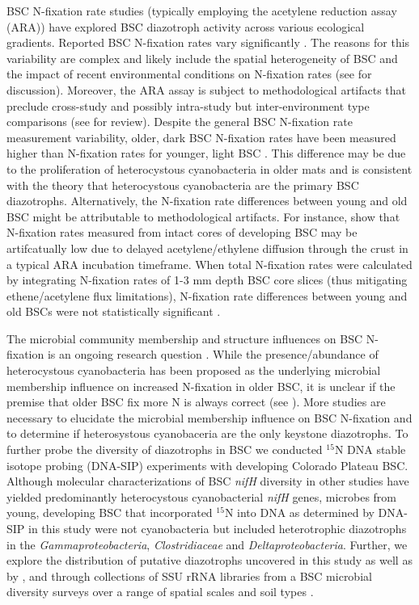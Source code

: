 BSC N-fixation rate studies (typically employing the acetylene reduction assay (ARA)) have explored BSC diazotroph activity across various ecological gradients. Reported BSC N-fixation rates vary significantly \cite{Evans_2001}. The reasons for this variability are complex and likely include the spatial heterogeneity of BSC \cite{Evans_2001} and the impact of recent environmental conditions on N-fixation rates (see \citet{Belnap_2001} for discussion). Moreover, the ARA assay is subject to methodological artifacts that preclude cross-study and possibly intra-study but inter-environment type comparisons (see \citet{Belnap_2001} for review). Despite the general BSC N-fixation rate measurement variability, older, dark BSC N-fixation rates have been measured higher than N-fixation rates for younger, light BSC \cite{Belnap_2002}. This difference may be due to the proliferation of heterocystous cyanobacteria in older mats and is consistent with the theory that heterocystous cyanobacteria are the primary BSC diazotrophs. Alternatively, the N-fixation rate differences between young and old BSC might be attributable to methodological artifacts. For instance, \citet{15643930} show that N-fixation rates measured from intact cores of developing BSC may be artifcatually low due to delayed acetylene/ethylene diffusion through the crust in a typical ARA incubation timeframe. When total N-fixation rates were calculated by integrating N-fixation rates of 1-3 mm depth BSC core slices (thus mitigating ethene/acetylene flux limitations), N-fixation rate differences between young and old BSCs were not statistically significant \cite{15643930}.

The microbial community membership and structure influences on BSC N-fixation is an ongoing research question \cite{Belnap28062013}. While the presence/abundance of heterocystous cyanobacteria has been proposed as the underlying microbial membership influence on increased N-fixation in older BSC, it is unclear if the premise that older BSC fix more N is always correct (see \citet{15643930}). More studies are necessary to elucidate the microbial membership influence on BSC N-fixation and to determine if  heterosystous cyanobaceria are the only keystone diazotrophs. To further probe the diversity of diazotrophs in BSC we conducted $^{15}$N DNA stable isotope probing (DNA-SIP) experiments with developing Colorado Plateau BSC. Although molecular characterizations of BSC \textit{nifH} diversity in other studies have yielded predominantly heterocystous cyanobacterial \textit{nifH} genes, microbes from young, developing BSC that incorporated $^{15}$N into DNA as determined by DNA-SIP in this study were not cyanobacteria but included heterotrophic diazotrophs in the \textit{Gammaproteobacteria}, \textit{Clostridiaceae} and \textit{Deltaproteobacteria}. Further, we explore the distribution of putative diazotrophs uncovered in this study as well as by \citet{14766579}, \citet{Yeager} and \citet{Yeager_2012} through collections of SSU rRNA libraries from a BSC microbial diversity surveys over a range of spatial scales and soil types \cite{Garcia_Pichel_2013, Steven_2013}.  